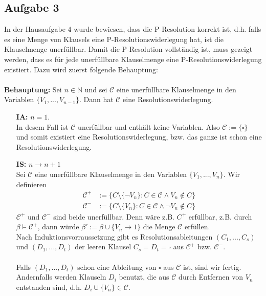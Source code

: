 \documentclass[a4paper,10pt]{article}
\begin{document}
\subsection*{Aufgabe 3}
In der Hausaufgabe 4 wurde bewiesen, dass die P-Resolution korrekt ist, d.h. falls es eine Menge von Klausels eine P-Resolutionswiderlegung hat, ist die Klauselmenge unerfüllbar. Damit die P-Resolution vollständig ist, muss gezeigt werden, dass  es für jede unerfüllbare Klauselmenge eine P-Resolutionswiderlegung existiert. Dazu wird zuerst folgende Behauptung: \\
\ \\
\textbf{Behauptung: } Sei $n \in \mathbb{N}$ und sei $\mathcal{C}$ eine unerfüllbare Klauselmenge in den Variablen $\{V_1,...,V_{n-1} \}$. Dann hat $\mathcal{C}$ eine Resolutionswiderlegung. 
\begin{itemize}
	\item[\textbf{IA:}] $n=1$. \\
		In desem Fall ist $\mathcal{C}$ unerfüllbar und enthält keine Variablen. Also $\mathcal{C} := \{ \square \}$ und somit existiert eine Resolutionswiderlegung, bzw. das ganze ist schon eine Resolutionswiderlegung.
	\item[\textbf{IS:}] $n \rightarrow n+1$ \\
		Sei $\mathcal{C}$ eine unerfüllbare Klauselmenge in den Variablen $\{V_1,...,V_n \}$. Wir definieren
		\begin{align*}
			\mathcal{C}^+ &:= \{C \setminus \{ \lnot V_n  \}: C \in \mathcal{C} \land V_n \not \in C \} \\
			\mathcal{C}^- &:= \{C \setminus \{V_n  \}: C \in \mathcal{C} \land \lnot V_n \not \in C \}
		\end{align*}
		$\mathcal{C}^+$ und $\mathcal{C}^-$ sind beide unerfüllbar. Denn wäre z.B. $C^+$ erfüllbar, z.B. durch $\beta \vDash \mathcal{C}^+$, dann würde $\beta' := \beta \cup \{V_n \rightarrow 1 \}$ die Menge $\mathcal{C}$ erfüllen. \\
		Nach Induktionsvorraussetzung gibt es Resolutionsableitungen $(C_1,...,C_s)$ und $(D_1,...,D_t)$ der leeren Klausel $C_s = D_t = \square$ aus $\mathcal{C}^+$ bzw. $\mathcal{C}^-$. \\
		 \ \\
		Falls  $(D_1,...,D_t)$  schon eine Ableitung von $\square$ aus $\mathcal{C}$ ist, sind wir fertig. Andernfalls werden Klauseln $D_i$ benutzt, die aus $\mathcal{C}$ durch Entfernen von $V_n$ entstanden sind, d.h. $D_i \cup \{V_n \} \in \mathcal{C}$. \\

\end{itemize}
\end{document}
